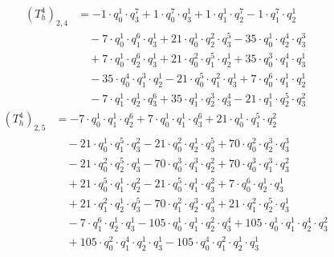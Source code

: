 \begin{align*}(T_{h}^4)_{2,4}&=-1\cdot q_0^{1}\cdot q_3^{7}+1\cdot q_0^{7}\cdot q_3^{1}+1\cdot q_1^{1}\cdot q_2^{7}-1\cdot q_1^{7}\cdot q_2^{1}\\
&\quad -7\cdot q_0^{1}\cdot q_1^{6}\cdot q_3^{1}+21\cdot q_0^{1}\cdot q_2^{2}\cdot q_3^{5}-35\cdot q_0^{1}\cdot q_2^{4}\cdot q_3^{3}\\
&\quad +7\cdot q_0^{1}\cdot q_2^{6}\cdot q_3^{1}+21\cdot q_0^{2}\cdot q_1^{5}\cdot q_2^{1}+35\cdot q_0^{3}\cdot q_1^{4}\cdot q_3^{1}\\
&\quad -35\cdot q_0^{4}\cdot q_1^{3}\cdot q_2^{1}-21\cdot q_0^{5}\cdot q_1^{2}\cdot q_3^{1}+7\cdot q_0^{6}\cdot q_1^{1}\cdot q_2^{1}\\
&\quad -7\cdot q_1^{1}\cdot q_2^{1}\cdot q_3^{6}+35\cdot q_1^{1}\cdot q_2^{3}\cdot q_3^{4}-21\cdot q_1^{1}\cdot q_2^{5}\cdot q_3^{2}\end{align*}
\begin{align*}(T_{h}^4)_{2,5}&=-7\cdot q_0^{1}\cdot q_1^{1}\cdot q_2^{6}+7\cdot q_0^{1}\cdot q_1^{1}\cdot q_3^{6}+21\cdot q_0^{1}\cdot q_1^{5}\cdot q_2^{2}\\
&\quad -21\cdot q_0^{1}\cdot q_1^{5}\cdot q_3^{2}-21\cdot q_0^{2}\cdot q_2^{1}\cdot q_3^{5}+70\cdot q_0^{2}\cdot q_2^{3}\cdot q_3^{3}\\
&\quad -21\cdot q_0^{2}\cdot q_2^{5}\cdot q_3^{1}-70\cdot q_0^{3}\cdot q_1^{3}\cdot q_2^{2}+70\cdot q_0^{3}\cdot q_1^{3}\cdot q_3^{2}\\
&\quad +21\cdot q_0^{5}\cdot q_1^{1}\cdot q_2^{2}-21\cdot q_0^{5}\cdot q_1^{1}\cdot q_3^{2}+7\cdot q_0^{6}\cdot q_2^{1}\cdot q_3^{1}\\
&\quad +21\cdot q_1^{2}\cdot q_2^{1}\cdot q_3^{5}-70\cdot q_1^{2}\cdot q_2^{3}\cdot q_3^{3}+21\cdot q_1^{2}\cdot q_2^{5}\cdot q_3^{1}\\
&\quad -7\cdot q_1^{6}\cdot q_2^{1}\cdot q_3^{1}-105\cdot q_0^{1}\cdot q_1^{1}\cdot q_2^{2}\cdot q_3^{4}+105\cdot q_0^{1}\cdot q_1^{1}\cdot q_2^{4}\cdot q_3^{2}\\
&\quad +105\cdot q_0^{2}\cdot q_1^{4}\cdot q_2^{1}\cdot q_3^{1}-105\cdot q_0^{4}\cdot q_1^{2}\cdot q_2^{1}\cdot q_3^{1}\end{align*}
